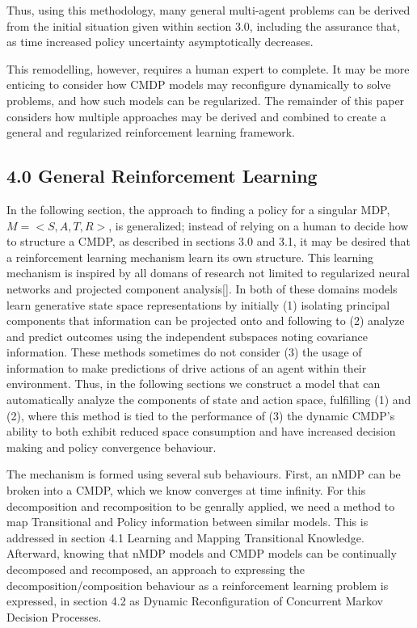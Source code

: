 \documentclass[]{article}
\begin{document}
Thus, using this methodology, many general multi-agent problems can be
derived from the initial situation given within section 3.0, including
the assurance that, as time increased policy uncertainty asymptotically
decreases.

This remodelling, however, requires a human expert to complete. It may
be more enticing to consider how CMDP models may reconfigure dynamically
to solve problems, and how such models can be regularized. The remainder
of this paper considers how multiple approaches may be derived and
combined to create a general and regularized reinforcement learning
framework.

\subsection{4.0 General Reinforcement
Learning}\label{general-reinforcement-learning}

In the following section, the approach to finding a policy for a
singular MDP, \(M = < S,A,T,R >\), is generalized; instead of relying on
a human to decide how to structure a CMDP, as described in sections 3.0
and 3.1, it may be desired that a reinforcement learning mechanism learn
its own structure. This learning mechanism is inspired by all domans of
research not limited to regularized neural networks and projected
component analysis{[}{]}. In both of these domains models learn
generative state space representations by initially (1) isolating
principal components that information can be projected onto and
following to (2) analyze and predict outcomes using the independent
subspaces noting covariance information. These methods sometimes do not
consider (3) the usage of information to make predictions of drive
actions of an agent within their environment. Thus, in the following
sections we construct a model that can automatically analyze the
components of state and action space, fulfilling (1) and (2), where this
method is tied to the performance of (3) the dynamic CMDP's ability to
both exhibit reduced space consumption and have increased decision
making and policy convergence behaviour.

The mechanism is formed using several sub behaviours. First, an nMDP can
be broken into a CMDP, which we know converges at time infinity. For
this decomposition and recomposition to be genrally applied, we need a
method to map Transitional and Policy information between similar
models. This is addressed in section 4.1 Learning and Mapping
Transitional Knowledge. Afterward, knowing that nMDP models and CMDP
models can be continually decomposed and recomposed, an approach to
expressing the decomposition/composition behaviour as a reinforcement
learning problem is expressed, in section 4.2 as Dynamic Reconfiguration
of Concurrent Markov Decision Processes.
\end{document}
